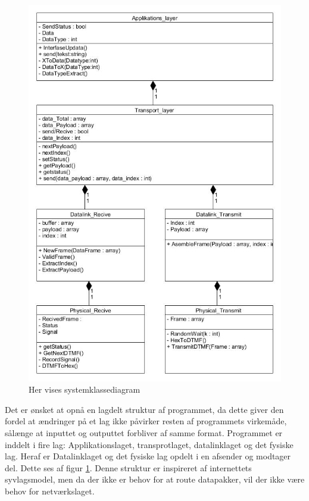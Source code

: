 \begin{figure}[h]
\centering
\includegraphics[scale=0.45]{Billeder/Klassediagram_v1.jpg}
\caption{Her vises systemklassediagram}
\label{fig:Klassediagram_v1}
\end{figure}

Det er ønsket at opnå en lagdelt struktur af programmet, da dette giver den fordel at ændringer på et lag ikke påvirker resten af programmets virkemåde, sålænge at inputtet og outputtet forbliver af samme format. Programmet er inddelt i fire lag:  Applikationslaget, transprotlaget, datalinklaget og det fysiske lag. Heraf er Datalinklaget og det fysiske lag opdelt i en afsender og modtager del. Dette ses af figur \ref{fig:Klassediagram_v1}. Denne struktur er inspireret af internettets syvlagsmodel, men da der ikke er behov for at route datapakker, vil der ikke være behov for netværkslaget. 

